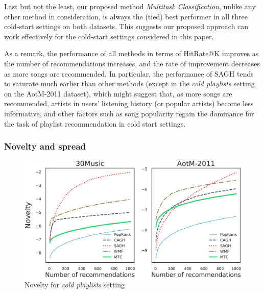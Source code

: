 Last but not the least, our proposed method {\it Multitask Classification}, unlike any other method in consideration,
is always the (tied) best performer in all three cold-start settings on both datasets.
This suggests our proposed approach can work effectively for the cold-start settings considered in this paper.

As a remark, the performance of all methods in terms of HitRate@K improves as the number of recommendations increases,
and the rate of improvement decreases as more songs are recommended.
In particular, the performance of SAGH tends to saturate much earlier than other methods 
(except in the \emph{cold playlists} setting on the AotM-2011 dataset),
which might suggest that, as more songs are recommended, artists in users' listening history (or popular artists) become less informative,
and other factors such as song popularity regain the dominance for the task of playlist recommendation in cold start settings.


\subsubsection{Novelty and spread}

\begin{figure}[!t]
    \centering
    \includegraphics[width=\columnwidth]{fig/nov3.pdf}
    \caption{Novelty for \emph{cold playlists} setting}
\end{figure}



